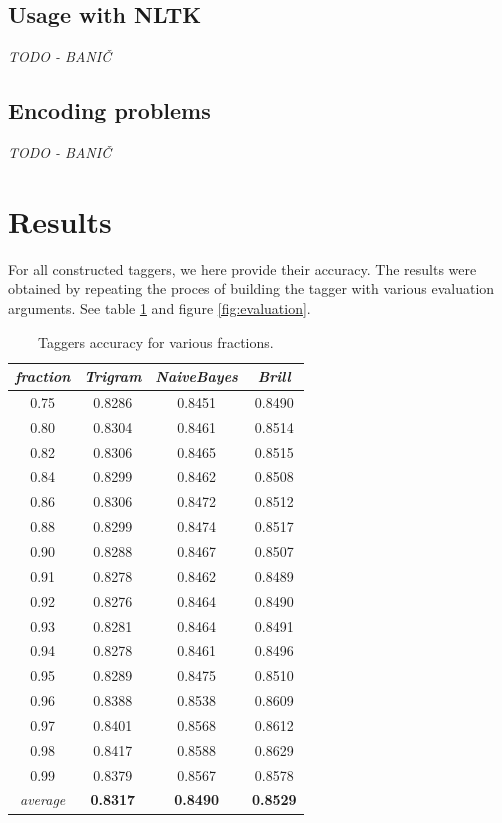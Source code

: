 \documentclass[11pt, conference, compsocconf]{IEEEtran}
\begin{document}
\subsection{Usage with NLTK} %
\textit{TODO - BANIČ}
\subsection{Encoding problems} %
\textit{TODO - BANIČ}

\section{Results} %
\label{results}
For all constructed taggers, we here provide their accuracy. The results were obtained by repeating the proces of building the tagger with various evaluation arguments. See table \ref{tab:evaluation} and figure \ref{fig:evaluation}.

\begin{table}[htb]
\begin{center}
\begin{tabular}{c|c|c|c}
\textit{fraction} & \textit{Trigram} & \textit{NaiveBayes} & \textit{Brill} \\\hline\hline
0.75  &  0.8286  &  0.8451  &  0.8490\\
0.80  &  0.8304  &  0.8461  &  0.8514\\
0.82  &  0.8306  &  0.8465  &  0.8515\\
0.84  &  0.8299  &  0.8462  &  0.8508\\
0.86  &  0.8306  &  0.8472  &  0.8512\\
0.88  &  0.8299  &  0.8474  &  0.8517\\
0.90  &  0.8288  &  0.8467  &  0.8507\\
0.91  &  0.8278  &  0.8462  &  0.8489\\
0.92  &  0.8276  &  0.8464  &  0.8490\\
0.93  &  0.8281  &  0.8464  &  0.8491\\
0.94  &  0.8278  &  0.8461  &  0.8496\\
0.95  &  0.8289  &  0.8475  &  0.8510\\
0.96  &  0.8388  &  0.8538  &  0.8609\\
0.97  &  0.8401  &  0.8568  &  0.8612\\
0.98  &  0.8417  &  0.8588  &  0.8629\\
0.99  &  0.8379  &  0.8567  &  0.8578\\\hline\hline
\textit{average} & \textbf{0.8317} & \textbf{0.8490} & \textbf{0.8529}
\end{tabular}
\end{center}
\caption{Taggers accuracy for various fractions.}
\label{tab:evaluation}
\end{table}
\end{document}
